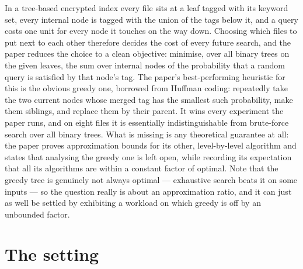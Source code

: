\documentclass{aicr-conjecture}
\begin{document}

\vspace{0.4em}

\begin{informalconjecture}
In a tree-based encrypted index every file sits at a leaf tagged with its
keyword set, every internal node is tagged with the union of the tags
below it, and a query costs one unit for every node it touches on the way
down. Choosing which files to put next to each other therefore decides
the cost of every future search, and the paper reduces the choice to a
clean objective: minimise, over all binary trees on the given leaves, the
sum over internal nodes of the probability that a random query is
satisfied by that node's tag. The paper's best-performing heuristic for
this is the obvious greedy one, borrowed from Huffman coding: repeatedly
take the two current nodes whose merged tag has the smallest such
probability, make them siblings, and replace them by their parent. It
wins every experiment the paper runs, and on eight files it is
essentially indistinguishable from brute-force search over all binary
trees. What is missing is any theoretical guarantee at all: the paper
proves approximation bounds for its other, level-by-level algorithm and
states that analysing the greedy one is left open, while recording its
expectation that all its algorithms are within a constant factor of
optimal. Note that the greedy tree is genuinely not always optimal ---
exhaustive search beats it on some inputs --- so the question really is
about an approximation ratio, and it can just as well be settled by
exhibiting a workload on which greedy is off by an unbounded factor.
\end{informalconjecture}

\section{The setting}\label{sec:setting}
\end{document}
